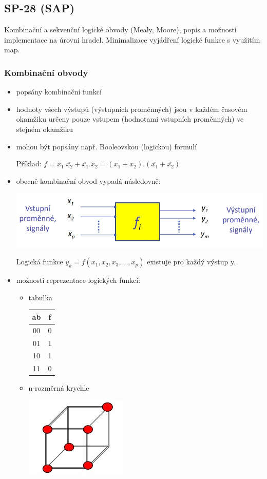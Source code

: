 \subsection{SP-28 (SAP)}
Kombinační a sekvenční logické obvody (Mealy, Moore), popis a možnosti implementace na úrovni hradel. Minimalizace vyjádření logické funkce s využitím map.

\subsubsection*{Kombinační obvody}
\begin{itemize}
	\item popsány kombinační funkcí
	\item hodnoty všech výstupů (výstupních proměnných) jsou v každém časovém okamžiku určeny pouze vstupem (hodnotami vstupních proměnných) ve stejném okamžiku
	\item mohou být popsány např. Booleovskou (logickou) formulí
	
	Příklad: $f=x_1.\overline{x_2}+\overline{x_1}.x_2=(x_1+x_2).(\overline{x_1}+\overline{x_2})$
	
	\item obecně kombinační obvod vypadá následovně:
	
	\includegraphics[width=0.7\linewidth]{img/SP-28_0.jpg}
	
	Logická funkce $y_k=f(x_1,x_2,x_3,...,x_p)$	existuje pro každý výstup y.
	
	\item možnosti reprezentace logických funkcí:
	\begin{itemize}
		\item tabulka
		
		\begin{tabular}{ |c|c| }
		\hline
		ab & f \\
		\hline
		00 & 0 \\
		01 & 1 \\
		10 & 1 \\
		11 & 0 \\
		\hline
		\end{tabular}
		
		\item n-rozměrná krychle
		
		\includegraphics[width=0.2\linewidth]{img/SP-28_1.jpg}		
		

\end{itemize}
\end{itemize}
